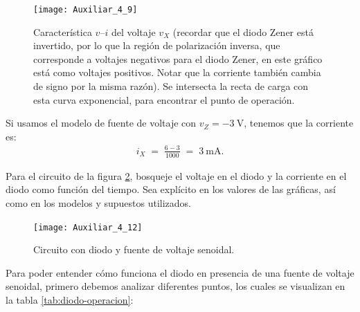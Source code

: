 \documentclass[
  11pt,
  letterpaper,
   addpoints,
   answers
  ]{exam}
\begin{document}
\begin{questions}
\begin{solution}
\begin{figure}[H]
  \centering
  \texttt{[image: Auxiliar\_4\_9]}
  \caption{Característica $v$--$i$ del voltaje $v_X$ (recordar que el diodo Zener está invertido, por lo que la región de polarización inversa, que corresponde a voltajes negativos para el diodo Zener, en este gráfico está como voltajes positivos. Notar que la corriente también cambia de signo por la misma razón). Se intersecta la recta de carga con esta curva exponencial, para encontrar el punto de operación.}

  \label{fig:iv-diodo}
\end{figure}
Si usamos el modelo de fuente de voltaje con \(v_Z = -3~\text{V}\), tenemos que la corriente es:
\begin{align}
i_X \;=\; \frac{6 -3 }{1000} \;=\; 3~\text{mA}.
\end{align}
\end{solution}
\newpage
\question Para el circuito de la figura \ref{fig:3}, bosqueje el voltaje en el diodo y la corriente en el diodo como función del tiempo. Sea explícito en los valores de las gráficas, así como en los modelos y supuestos utilizados.
\begin{figure}[H]
  \centering
\texttt{[image: Auxiliar\_4\_12]}
  \caption{Circuito con diodo y fuente de voltaje senoidal.}
  \label{fig:3}
\end{figure}
\begin{solution}
Para poder entender cómo funciona el diodo en presencia de una fuente de voltaje senoidal, primero debemos analizar diferentes puntos, los cuales se visualizan en la tabla \ref{tab:diodo-operacion}:


\end{solution}
\end{questions}
\end{document}
